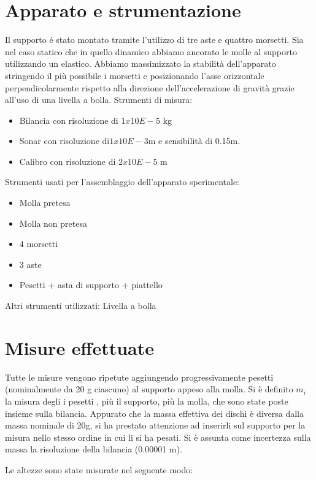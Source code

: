 \documentclass{article}
\begin{document}
\section{Apparato e strumentazione}
Il supporto é stato montato tramite l’utilizzo di tre aste e quattro morsetti. 
Sia nel caso statico che in quello dinamico abbiamo ancorato le molle al supporto utilizzando un elastico.
Abbiamo massimizzato la stabilità dell’apparato stringendo il più possibile i morsetti e posizionando l’asse orizzontale perpendicolarmente rispetto alla direzione dell’accelerazione di gravità grazie all’uso di una livella a bolla.
Strumenti di misura:
\begin{itemize} 

\item	Bilancia con risoluzione di $1x10E-5$ kg
\item	Sonar con risoluzione di$ 1x10E-3$m  e sensibilità di  0.15m. 
\item	Calibro con risoluzione di $2x10E-5$ m
\end{itemize}
Strumenti usati per l'assemblaggio dell’apparato sperimentale:
\begin{itemize}

\item	Molla pretesa
\item	Molla non pretesa
\item	4 morsetti
\item	3 aste
\item	Pesetti + asta di supporto + piattello


\end{itemize}
Altri strumenti utilizzati: 
Livella a bolla 


\section{Misure effettuate}
Tutte le misure vengono ripetute aggiungendo progressivamente pesetti (nominalmente da 20 g ciascuno) al supporto appeso alla molla. 
Si è definito $m_i$  la misura degli i pesetti , più il supporto, più la molla, che sono state poste insieme sulla bilancia. Appurato che la massa effettiva dei dischi è diversa dalla massa nominale di 20g, si ha  prestato attenzione ad inserirli sul supporto per la misura nello stesso ordine in cui li si ha pesati. Si è assunta come incertezza sulla massa la risoluzione della bilancia (0.00001 m). 

Le altezze sono state misurate nel seguente modo:
\end{document}
